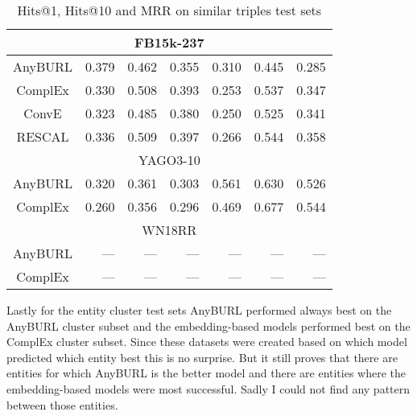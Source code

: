 \begin{table}[H]
\begin{tabular}{crrrrrr|}
\multicolumn{7}{|c|}{FB15k-237} \\ \hline
\multicolumn{1}{c|}{AnyBURL} & 0.379 & 0.462 & \multicolumn{1}{r|}{0.355} & 0.310 & 0.445 & 0.285 \\
\multicolumn{1}{c|}{ComplEx} & 0.330 & 0.508 & \multicolumn{1}{r|}{0.393} & 0.253 & 0.537 & 0.347 \\
\multicolumn{1}{c|}{ConvE} & 0.323 & 0.485 & \multicolumn{1}{r|}{0.380} & 0.250 & 0.525 & 0.341 \\
\multicolumn{1}{c|}{RESCAL} & 0.336 & 0.509 & \multicolumn{1}{r|}{0.397} & 0.266 & 0.544 & 0.358 \\ \hline
\multicolumn{7}{|c|}{YAGO3-10} \\ \hline
\multicolumn{1}{c|}{AnyBURL} & 0.320 & 0.361 &  \multicolumn{1}{r|}{0.303} & 0.561 & 0.630 & 0.526 \\
\multicolumn{1}{c|}{ComplEx} & 0.260 & 0.356 & \multicolumn{1}{r|}{0.296} & 0.469 & 0.677 & 0.544 \\ \hline
\multicolumn{7}{|c|}{WN18RR} \\ \hline
\multicolumn{1}{c|}{AnyBURL} & --- & --- & \multicolumn{1}{r|}{---} & --- & --- & --- \\
\multicolumn{1}{c|}{ComplEx} & --- & --- & \multicolumn{1}{r|}{---} & --- & --- & ---
\end{tabular}
\caption{Hits@1, Hits@10 and MRR on similar triples test sets}
\label{tab:testsets_similar_triples_metrics}
\end{table}

Lastly for the entity cluster test sets AnyBURL performed always best on the AnyBURL cluster subset and the embedding-based models performed best on the ComplEx cluster subset. Since these datasets were created based on which model predicted which entity best this is no surprise. But it still proves that there are entities for which AnyBURL is the better model and there are entities where the embedding-based models were most successful. Sadly I could not find any pattern between those entities.

